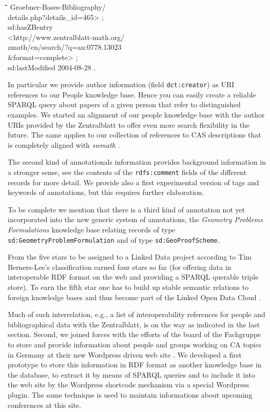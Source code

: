 \documentclass[a4paper,11pt]{article}
\newenvironment{code}{\par\small\tt\footnotesize \begin{tabbing}
\hskip12pt\=\hskip12pt\=\hskip12pt\=\hskip12pt\=\hskip5cm\=\hskip5cm\=\kill}
{\end{tabbing}\normalsize}
\begin{document}
\begin{multicols}{2}
\begin{code}
  Groebner-Bases-Bibliography/\\\>\> details.php?details\_id=465> ;\\ 
  sd:hasZBentry\\\> <http://www.zentralblatt-math.org/\\\>\>
  zmath/en/search/?q=an:0778.13023\\\>\> \&format=complete> ;\\ 
  sd:lastModified {\dq}2004-08-28{\dq} .
\end{code}
In particular we provide author information (field \texttt{dct:creator}) as URI
references to our People knowledge base. Hence you can easily create a reliable
SPARQL query about papers of a given person that refer to distinguished
examples.  We started an alignment of our people knowledge base with the author
URIs provided by the Zentralblatt to offer even more search flexibility in the
future. The same applies to our collection of references to CAS descriptions
that is completely aligned with \emph{swmath} \cite{swmath}.

The second kind of annotationals information provides background information in
a stronger sense, see the contents of the \texttt{rdfs:comment} fields of the
different records for more detail.  We provide also a first experimental
version of tags and keywords of annotations, but this requires further
elaboration.

To be complete we mention that there is a third kind of annotation not yet
incorporated into the new generic system of annotations, the \emph{Geometry
  Problems Formulations} knowledge base relating records of type
\texttt{sd:GeometryProblemFormulation} and of type \texttt{sd:GeoProofScheme}.


From the five stars to be assigned to a Linked Data project according to Tim
Berners-Lee's classification \cite{5stars} {\SD} earned four stars so far (for
offering data in interoperable RDF format on the web and providing a SPARQL
querable triple store).  To earn the fifth star one has to build up stable
semantic relations to foreign knowledge bases and thus become part of the
Linked Open Data Cloud \cite{lod}.

Much of such interrelation, e.g., a list of inter\-operability references for
people and bibliographical data with the Zentralblatt, is on the way as
indicated in the last section.  Second, we joined forces with the efforts of
the board of the Fachgruppe to store and provide information about people and
groups working on CA topics in Germany at their new Wordpress driven web site
\cite{cafg}.  We developed a first prototype to store this information in RDF
format as another knowledge base in the {\SD} database, to extract it by means
of SPARQL queries and to include it into the web site by the Wordpress
shortcode mechanism via a special Wordpress plugin.  The same technique is used
to maintain informations about upcoming conferences at this site.


\end{multicols}
\end{document}
